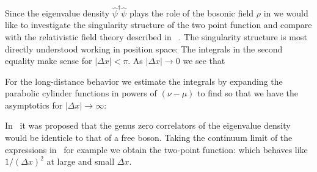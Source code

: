 Since the eigenvalue density $\hat\psi^\dagger\hat\psi$ plays the 
role of the bosonic field $\rho$ in \dsjv
we would like to investigate the singularity structure of 
the two point function and compare with the relativistic
field theory described in 
\dsjv\senwad
\gk\ . The singularity structure is 
most directly understood working in position space:
\eqn{}
The integrals in the second equality make sense for
$|\Delta x|<\pi$. 
As $|\Delta x|\to 0$ we see that 
\eqn{}

For the long-distance behavior we estimate the integrals by 
expanding the parabolic cylinder functions in powers of $(\nu-\mu)$
to find
\eqn{}
so that we have the asymptotics for $|\Delta x|\to \infty$:
\eqn{}

In \dsjv\senwad\gk\ it was proposed that the genus zero correlators
of the eigenvalue density would be identicle to that of a free boson.
Taking the continuum limit of the expressions in \senwad\gk\ for 
example we obtain the two-point function:
\eqn{}
which behaves like $1/(\Delta x)^2$ at large and small $\Delta x$. 

